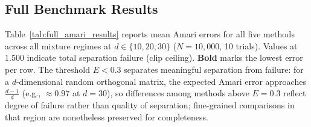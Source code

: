 \documentclass[accepted]{tpm2026} %
\begin{document}
\subsection{Full Benchmark Results}
\label{app:full_results}

Table~\ref{tab:full_amari_results} reports mean Amari errors for all five methods across all mixture regimes at $d \in \{10, 20, 30\}$ ($N=10{,}000$, 10 trials). Values at 1.500 indicate total separation failure (clip ceiling). \textbf{Bold} marks the lowest error per row. The threshold $E < 0.3$ separates meaningful separation from failure: for a $d$-dimensional random orthogonal matrix, the expected Amari error approaches $\frac{d-1}{d}$ (e.g., $\approx 0.97$ at $d=30$), so differences among methods above $E=0.3$ reflect degree of failure rather than quality of separation; fine-grained comparisons in that region are nonetheless preserved for completeness.
\end{document}
